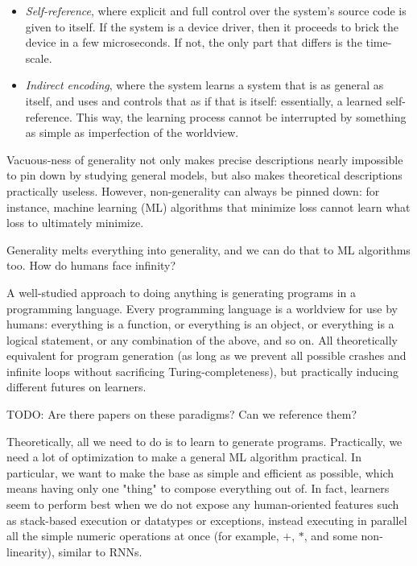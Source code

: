 \documentclass{article}
\begin{document}
\begin{itemize}
\item \textit{Self-reference}, where explicit and full control over the system's source code is given to itself. If the system is a device driver, then it proceeds to brick the device in a few microseconds. If not, the only part that differs is the time-scale.
\item \textit{Indirect encoding}, where the system learns a system that is as general as itself, and uses and controls that as if that is itself: essentially, a learned self-reference. This way, the learning process cannot be interrupted by something as simple as imperfection of the worldview.
\end{itemize}

Vacuous-ness of generality not only makes precise descriptions nearly impossible to pin down by studying general models, but also makes theoretical descriptions practically useless. However, non-generality can always be pinned down: for instance, machine learning (ML) algorithms that minimize loss cannot learn what loss to ultimately minimize.

Generality melts everything into generality, and we can do that to ML algorithms too. How do humans face infinity?

A well-studied approach to doing anything is generating programs in a programming language. Every programming language is a worldview for use by humans: everything is a function, or everything is an object, or everything is a logical statement, or any combination of the above, and so on. All theoretically equivalent for program generation (as long as we prevent all possible crashes and infinite loops without sacrificing Turing-completeness), but practically inducing different futures on learners.

    TODO: Are there papers on these paradigms? Can we reference them?

Theoretically, all we need to do is to learn to generate programs. Practically, we need a lot of optimization to make a general ML algorithm practical. In particular, we want to make the base as simple and efficient as possible, which means having only one "thing" to compose everything out of. In fact, learners seem to perform best when we do not expose any human-oriented features such as stack-based execution or datatypes or exceptions, instead executing in parallel all the simple numeric operations at once (for example, $+$, $*$, and some non-linearity), similar to RNNs.
\end{document}
